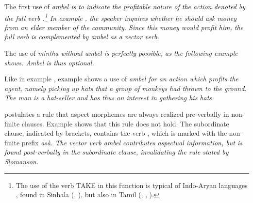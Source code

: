 The first use of \em ambel \em is to indicate the profitable nature of the action denoted by the full verb .\footnote{The use of the verb TAKE in this function is typical of Indo-Aryan languages \citep[175]{AbbiEtAl1991evc},   found in Sinhala (\citet[44]{Jayawardena2004}, \citet[81]{Matzel1983}), but also in Tamil (\citet[193]{Arden1934}, \citet[95]{Schiffman1999}, \citet{Fedson1993}).} In example , the speaker inquires whether he should ask money from an elder member of the community. Since this money would profit him, the full verb  is complemented by \em ambel \em as a vector verb.



The use of \em mintha \em without \em ambel \em is perfectly possible, as the following example shows. \em Ambel \em is thus optional.



Like in  example ,   example   shows a use of \em ambel \em for an action which profits the agent, namely picking up hats that a group of monkeys had thrown to the ground. The man is a hat-seller and has thus an interest in gathering his hats.


\citet{Slomanson2008ismil} postulates a rule that aspect morphemes are always realized pre-verbally in non-finite clauses. Example  shows that this rule does not hold. The subordinate clause, indicated by brackets, contains the verb , which is marked with the non-finite prefix \em asà\em. The vector verb \em ambel \em contributes aspectual information, but is found \em post\em-verbally in the subordinate clause, invalidating the rule stated by Slomanson.

